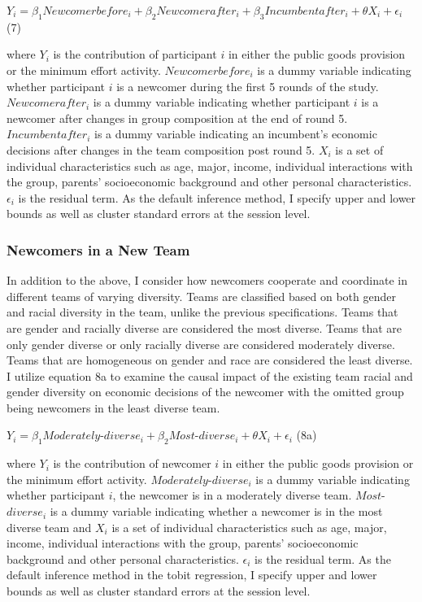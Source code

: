 \begin{center}
 $ Y_{i} = \beta_1 Newcomerbefore_{i} + \beta_2 Newcomerafter_{i} + \beta_3 Incumbentafter_{i} + \theta X_{i} + \epsilon_{i}  $  \space \space \space  \space \space \space  \space \space \space \space  \space \space \space  \space \space \space   (7)
\end{center}

\noindent where $Y_{i}$ is the contribution of participant $i$ in either the public goods provision or the minimum effort activity. $Newcomerbefore_{i}$ is a dummy variable indicating whether participant $i$ is a newcomer during the first 5 rounds of the study. $Newcomerafter_{i}$ is a dummy variable indicating whether participant $i$ is a newcomer after changes in group composition at the end of round 5. $Incumbentafter_{i}$ is a dummy variable indicating an incumbent's economic decisions after changes in the team composition post round 5. $X_{i}$ is a set of individual characteristics such as age, major, income, individual interactions with the group, parents' socioeconomic background and other personal characteristics. $\epsilon_{i}$ is the residual term. As the default inference method, I specify upper and lower bounds as well as cluster standard errors at the session level.

\subsubsection{Newcomers in a New Team}
In addition to the above, I consider how newcomers cooperate and coordinate in different teams of varying diversity. Teams are classified based on both gender and racial diversity in the team, unlike the previous specifications. Teams that are gender and racially diverse are considered the most diverse. Teams that are only gender diverse or only racially diverse are considered moderately diverse. Teams that are homogeneous on gender and race are considered the least diverse. I utilize equation 8a to examine the causal impact of the existing team racial and gender diversity on economic decisions of the newcomer with the omitted group being newcomers in the least diverse team. 

\begin{center}
 $ Y_{i} = \beta_1 Moderately$-$diverse_{i} + \beta_2 Most$-$diverse_{i} + \theta X_{i} + \epsilon_{i}  $  \space \space \space    (8a)
\end{center}

\noindent where $Y_{i}$ is the contribution of newcomer $i$ in either the public goods provision or the minimum effort activity. $Moderately$-$diverse_{i}$ is a dummy variable indicating whether participant $i$, the newcomer is in a moderately diverse team. $Most$-$diverse_{i}$ is a dummy variable indicating whether a newcomer is in the most diverse team and $X_{i}$ is a set of individual characteristics such as age, major, income, individual interactions with the group, parents' socioeconomic background and other personal characteristics. $\epsilon_{i}$ is the residual term. As the default inference method in the tobit regression, I specify upper and lower bounds as well as cluster standard errors at the session level.

